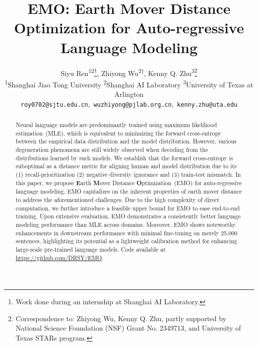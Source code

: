 \documentclass{article} %
\title{EMO: Earth Mover Distance Optimization for Auto-regressive Language Modeling}
\author{Siyu Ren\textsuperscript{12}\thanks{Work done during an internship at Shanghai AI Laboratory.}, Zhiyong Wu\textsuperscript{2$\dagger$}, Kenny Q. Zhu\textsuperscript{3}\thanks{Correspondence to: Zhiyong Wu, Kenny Q. Zhu, partly supported by National Science Foundation (NSF) Grant No. 2349713, and University of Texas STARs program.}\\
\textsuperscript{1}Shanghai Jiao Tong University
\textsuperscript{2}Shanghai AI Laboratory
\textsuperscript{3}University of Texas at Arlington \\
\texttt{roy0702@sjtu.edu.cn},~\texttt{wuzhiyong@pjlab.org.cn},~\texttt{kenny.zhu@uta.edu}\\
}
\begin{document}
\maketitle

\begin{abstract}
    Neural language models are predominantly trained using maximum likelihood estimation~(MLE), which is equivalent to minimizing the forward cross-entropy between the empirical data distribution and the model distribution. However, various degeneration phenomena are still widely observed when decoding from the distributions learned by such models. We establish that the forward cross-entropy is suboptimal as a distance metric for aligning human and model distribution due to its (1) recall-prioritization (2) negative diversity ignorance and (3) train-test mismatch. In this paper, we propose \textbf{E}arth \textbf{M}over Distance \textbf{O}ptimization~(EMO) for auto-regressive language modeling. EMO capitalizes on the inherent properties of earth mover distance to address the aforementioned challenges. Due to the high complexity of direct computation, we further introduce a feasible upper bound for EMO to ease end-to-end training. Upon extensive evaluation, EMO demonstrates a consistently better language modeling performance than MLE across domains.
    Moreover, EMO shows noteworthy enhancements in downstream performance with minimal fine-tuning on merely 25,000 sentences, highlighting its potential as a lightweight calibration method for enhancing large-scale pre-trained language models. Code available at \url{https://github.com/DRSY/EMO}.
\end{abstract}










\end{document}
